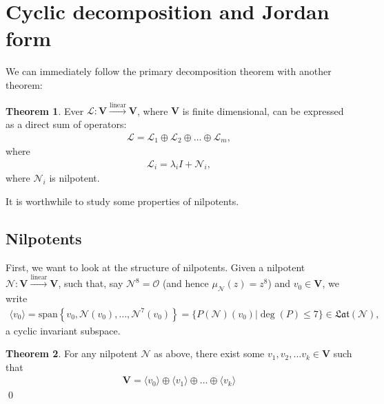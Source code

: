 \documentclass{article}
\theoremstyle{definition}
\newtheorem{thm}{Theorem}[section]
\newcommand{\V}{\mathbf{V}}
\newcommand{\xpan}{\text{span}}
\newcommand{\lag}{\mathcal{L}}
\newcommand{\lin}{\overset{\text{linear}}{\longrightarrow}}
\begin{document}
\newpage 
\section{Cyclic decomposition and Jordan form}

We can immediately follow the primary decomposition theorem with another theorem:

\begin{thm}
	Ever $\lag : \V \lin \V$, where $\V$ is finite dimensional, can be expressed as a direct sum of operators:
	\begin{align*}
	\lag = \lag_1 \oplus \lag_2 \oplus \dots \oplus \lag_m,
	\end{align*}
	where 
	\begin{align*}
	\lag_i = \lambda_i I + \mathcal{N}_i,
	\end{align*}
	where $\mathcal{N}_i$ is nilpotent. 
\end{thm}

It is worthwhile to study some properties of nilpotents.

\subsection{Nilpotents}

First, we want to look at the structure of nilpotents. Given a nilpotent $\mathcal{N} : \V \lin \V$, such that, say $\mathcal{N}^8 = \mathcal{O}$ (and hence $\mu_\mathcal{N}(z) = z^8$) and $v_0 \in \V$, we write
\begin{align*}
\langle v_0 \rangle = \xpan \left\{ v_0 ,\mathcal{N}(v_0),\dots, \mathcal{N}^7(v_0) \right\} = \{ P(\mathcal{N})(v_0) \big\vert \deg(P) \leq 7 \} \in \mathfrak{Lat}(\mathcal{N}),
\end{align*}
a cyclic invariant subspace. 

\begin{thm}
	For any nilpotent $\mathcal{N}$ as above, there exist some $v_1, v_2,\dots v_k \in \V$ such that 
	\begin{align*}
	\V = \langle v_0 \rangle \oplus \langle v_1 \rangle \oplus \dots \oplus \langle v_k \rangle
	\end{align*} \qed
\end{thm}
\end{document}
